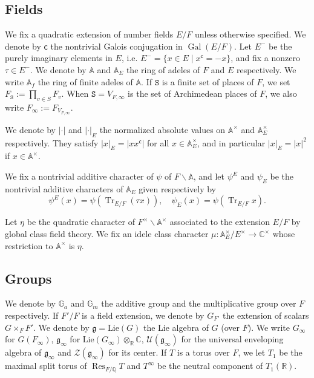 \documentclass[letterpaper,11pt]{amsart}
\newcommand{\fg}{\mathfrak{g}}
\newcommand{\bA}{\mathbb{A}}
\newcommand{\bG}{\mathbb{G}}
\newcommand{\C}{\mathbb{C}}
\newcommand{\Q}{\mathbb{Q}}
\newcommand{\R}{\mathbb{R}}
\newcommand{\cU}{\mathcal{U}}
\newcommand{\cZ}{\mathcal{Z}}
\newcommand{\tS}{\mathtt{S}}
\newcommand{\bs}{\backslash}
\newcommand{\<}{\negthickspace}
\DeclareMathOperator{\Gal}{Gal}
\providecommand{\abs}[1]{\lvert#1\rvert}
\DeclareMathOperator{\Tr}{Tr}
\DeclareMathOperator{\Res}{Res}
\theoremstyle{definition}
\theoremstyle{plain}
\theoremstyle{remark}
\numberwithin{equation}{section}
\begin{document}
\subsection{Fields}
\label{subsec:field}

We fix a quadratic extension of number fields $E/F$ unless otherwise specified. We denote by
$\textsf{c}$ the nontrivial Galois conjugation in $\Gal(E/F)$. Let $E^-$ be the purely imaginary elements in $E$,
i.e. $E^- = \{x \in E \mid x^\mathsf{c} = -x\}$, and fix a nonzero $\tau \in
E^-$. We denote by $\bA$ and $\bA_E$ the ring of adeles of $F$ and $E$
respectively. We write $\bA_{f}$
the ring of finite adeles of $\bA$. If $\tS$ is a finite set of places of $F$, we set $F_\tS := \prod_{v \in S} F_v$. When $\tS = V_{F,\infty}$ is the set of Archimedean places of $F$, we also write $F_{\infty} := F_{V_{F,\infty}}$.

We denote by $\abs{\cdot}$ and $\abs{\cdot}_E$ the normalized
absolute values on $\bA^\times$ and $\bA_E^\times$ respectively. They satisfy
$\abs{x}_E = \abs{x x^{\mathsf{c}}}$ for all $x \in \bA_E^\times$, and in particular
$\abs{x}_E = \abs{x}^2$ if $x \in \bA^\times$.

We fix a nontrivial additive character of $\psi$ of $F\bs \bA$, and let
$\psi^E$ and $\psi_E$ be the nontrivial additive characters of $\bA_E$ given
respectively by
    \[
    \psi^E(x) = \psi(\Tr_{E/F}(\tau x)), \quad \psi_E(x) = \psi(\Tr_{E/F} x).
    \]

Let $\eta$ be the quadratic character of $F^\times \bs \bA^\times$
associated to the extension $E/F$ by global class field theory. We fix an idele class character $\mu: \bA_E^\times/E^{\times} \to \C^\times$ whose restriction to $\bA^\times$ is $\eta$.



\subsection{Groups} \label{subsec:notation_intro_groups}

We denote by $\bG_a$ and $\bG_m$ the additive group and the multiplicative group
over $F$ respectively.  If $F'/F$ is a field extension,
we denote by $G_{F'}$ the extension of scalars $G \times_F F'$. We denote by
$\fg = \mathrm{Lie}(G)$ the Lie algebra of $G$ (over $F$).
We write $G_\infty$ for $G(F_\infty)$, $\fg_\infty$ for $\mathrm{Lie}(G_\infty)
\otimes_{\R} \C$, $\cU(\fg_{\infty})$ for the universal enveloping algebra of
$\fg_{\infty}$ and $\cZ(\fg_{\infty})$ for its center.
If $T$ is a torus over $F$, we let $T_1$ be the maximal split torus of
$\Res_{F/\Q} T$ and $T^\infty$ be the neutral component of $T_1(\R)$.
\end{document}

